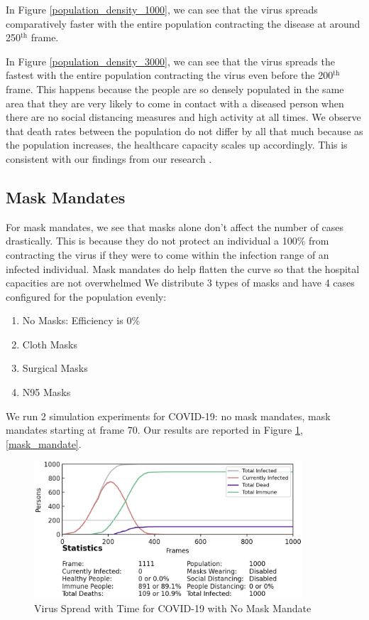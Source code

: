 \documentclass[11pt]{article}
\begin{document}
In Figure \ref{population_density_1000}, we can see that the virus spreads comparatively faster with the entire population contracting the disease at around 250$^\text{th}$ frame. 


In Figure \ref{population_density_3000}, we can see that the virus spreads the fastest with the entire population contracting the virus even before the 200$^\text{th}$ frame. This happens because the people are so densely populated in the same area that they are very likely to come in contact with a diseased person when there are no social distancing measures and high activity at all times. We observe that death rates between the population do not differ by all that much because as the population increases, the healthcare capacity scales up accordingly. This is consistent with our findings from our research \cite{covid_lowdeath}. 

\subsection{Mask Mandates} For mask mandates, we see that masks alone don't affect the number of cases drastically. This is because they do not protect an individual a 100\% from contracting the virus if they were to come within the infection range of an infected individual. Mask mandates do help flatten the curve so that the hospital capacities\cite{mask_wearing} are not overwhelmed We distribute 3 types of masks and have 4 cases configured for the population evenly:
\begin{enumerate}
    \item No Masks: Efficiency is 0\%
    \item Cloth Masks
    \item Surgical Masks
    \item N95 Masks
\end{enumerate}

We run 2 simulation experiments for COVID-19: no mask mandates, mask mandates starting at frame 70. Our results are reported in Figure \ref{no_mask_mandate}, \ref{mask_mandate}.

\begin{figure}[H]
    \centering
    \includegraphics[width=10cm]{figures/no_mask_mandate.png}
    \caption{Virus Spread with Time for COVID-19 with No Mask Mandate}
    \label{no_mask_mandate}
\end{figure}
\end{document}
